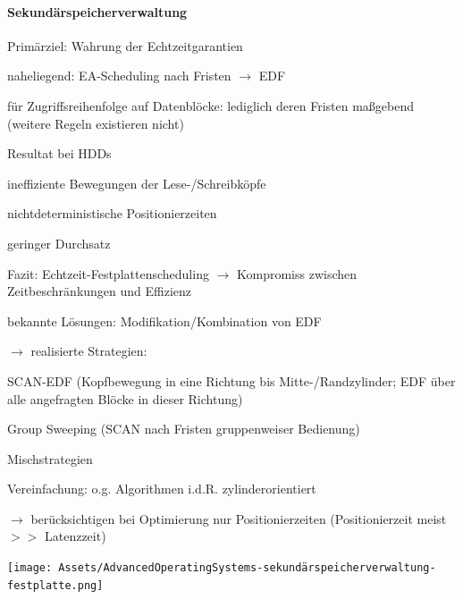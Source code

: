 \documentclass[a4paper]{article}
\begin{document}
\begin{multicols}{3}
    \paragraph{Sekundärspeicherverwaltung}
    \begin{itemize*}
        \item Primärziel: Wahrung der Echtzeitgarantien
        \begin{itemize*}
            \item naheliegend: EA-Scheduling nach Fristen $\rightarrow$ EDF
            \item für Zugriffsreihenfolge auf Datenblöcke: lediglich deren Fristen maßgebend (weitere Regeln existieren nicht)
        \end{itemize*}
        \item Resultat bei HDDs
        \begin{itemize*}
            \item ineffiziente Bewegungen der Lese-/Schreibköpfe
            \item nichtdeterministische Positionierzeiten
            \item geringer Durchsatz
        \end{itemize*}
        \item Fazit: Echtzeit-Festplattenscheduling $\rightarrow$ Kompromiss zwischen Zeitbeschränkungen und Effizienz
        \item bekannte Lösungen: Modifikation/Kombination von EDF
    \end{itemize*}
    $\rightarrow$ realisierte Strategien:
    \begin{enumerate*}
        \item SCAN-EDF (Kopfbewegung in eine Richtung bis Mitte-/Randzylinder; EDF über alle angefragten Blöcke in dieser
        Richtung)
        \item Group Sweeping (SCAN nach Fristen gruppenweiser Bedienung)
        \item Mischstrategien
    \end{enumerate*}
    \begin{itemize*}
        \item Vereinfachung: o.g. Algorithmen i.d.R. zylinderorientiert
        \item[$\rightarrow$] berücksichtigen bei Optimierung nur Positionierzeiten (Positionierzeit meist $>>$ Latenzzeit)
    \end{itemize*}
    \begin{center}
        \texttt{[image: Assets/AdvancedOperatingSystems-sekundärspeicherverwaltung-festplatte.png]}
    \end{center}


\end{multicols}
\end{document}
